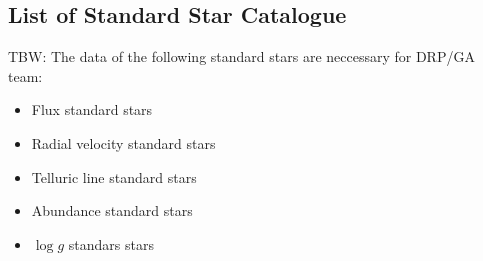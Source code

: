 \subsection{List of Standard Star Catalogue}

TBW:
The data of the following standard stars are neccessary for DRP/GA team:
\begin{itemize}
    \item Flux standard stars
    \item Radial velocity standard stars
    \item Telluric line standard stars
    \item Abundance standard stars
    \item $\log g$ standars stars
\end{itemize}
